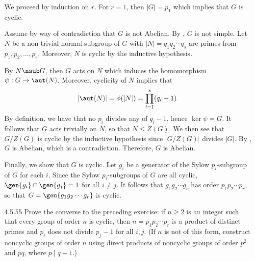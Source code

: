 \begin{sol}
	We proceed by induction on $r$.
	For $r = 1$, then $|G| = p_1$ which implies that $G$ is cyclic.

	Assume by way of contradiction that $G$ is not Abelian.
	By , $G$ is not simple.
	Let $N$ be a non-trivial normal subgroup of $G$ with $|N| = q_1q_2 \cdots q_s$ are primes from $p_1, p_2, \ldots, p_r$.
	Moreover, $N$ is cyclic by the inductive hypothesis.

	By $N \nsub G$, then $G$ acts on $N$ which induces the homomorphism $\psi : G \to \aut(N)$.
	Moreover, cyclicity of $N$ implies that
	\[
		|\aut(N)| = \phi(|N|) = \prod_{i = 1}^s (q_i - 1).
	\]
	By definition, we have that no $p_i$ divides any of $q_i - 1$, hence $\ker\psi = G$.
	It follows that $G$ acts trivially on $N$, so that $N \leq Z(G)$.
	We then see that $G/Z(G)$ is cyclic by the inductive hypothesis since $|G/Z(G)|$ divides $|G|$.
	By , $G$ is Abelian, which is a contradiction.
	Therefore, $G$ is Abelian.

	Finally, we show that $G$ is cyclic.
	Let $g_i$ be a generator of the Sylow $p_i$-subgroup of $G$ for each $i$.
	Since the Sylow $p_i$-subgroups of $G$ are all cyclic, $\gen{g_i} \cap \gen{g_j} = 1$ for all $i \neq j$.
	It follows that $g_1g_2 \cdots g_r$ has order $p_1p_2 \cdots p_r$, so that $G = \gen{g_1g_2 \cdots g_r}$ is cyclic.
\end{sol}

\begin{exercise}{4.5.55}
	Prove the converse to the preceding exercise: if $n \geq 2$ is an integer such that every group of order $n$ is cyclic, then $n = p_1p_2 \cdots p_r$ is a product of distinct primes and $p_i$ does not divide $p_j - 1$ for all $i, j$. (If $n$ is not of this form, construct noncyclic groups of order $n$ using direct products of noncyclic groups of order $p^2$ and $pq$, where $p \mid q - 1$.)
\end{exercise}

